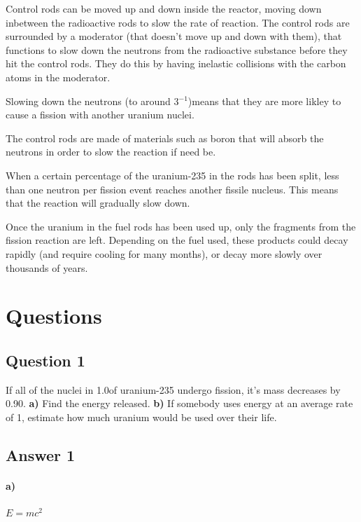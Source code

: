 \documentclass{article}
\begin{document}
Control rods can be moved up and down inside the reactor, moving down inbetween
the radioactive rods to slow the rate of reaction. The control rods are
surrounded by a moderator (that doesn't move up and down with them), that
functions to slow down the neutrons from the radioactive substance before they
hit the control rods. They do this by having inelastic collisions with the
carbon atoms in the moderator. 

Slowing down the neutrons (to around 3\kilo\meter\second$^{-1}$)means that they
are more likley to cause a fission with another uranium nuclei.

The control rods are made of materials such as boron that will absorb the
neutrons in order to slow the reaction if need be.

When a certain percentage of the uranium-235 in the rods has been split, less
than one neutron per fission event reaches another fissile nucleus. This means
that the reaction will gradually slow down.

Once the uranium in the fuel rods has been used up, only the fragments from the
fission reaction are left. Depending on the fuel used, these products could
decay rapidly (and require cooling for many months), or decay more slowly over
thousands of years.

\section*{Questions}

\subsection*{Question 1}

If all of the nuclei in 1.0\kilo\gram of uranium-235 undergo fission, it's mass
decreases by 0.90\gram. {\bf a)} Find the energy released. {\bf b)} If somebody
uses energy at an average rate of 1\kilo\watt, estimate how much uranium would
be used over their life.

\subsection*{Answer 1}

\paragraph{a)}
\setlength\parindent{20pt}

$E=mc^2$
\end{document}
